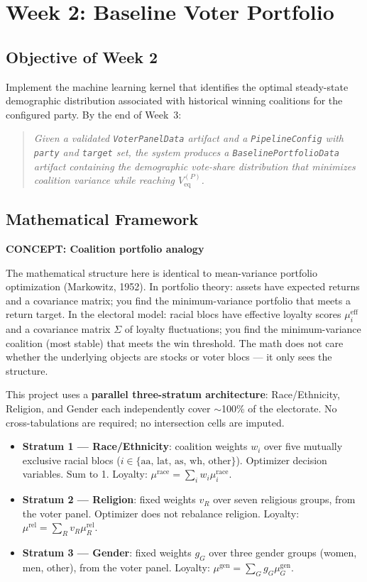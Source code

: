 \documentclass[11pt]{article}
\newcommand{\concept}[2]{%
  \begin{mdframed}[style=conceptbox]
  {\small\bfseries\color{bluefg}CONCEPT: #1}\par\smallskip #2
  \end{mdframed}}
\newcommand{\veq}{V_{\mathrm{eq}}}
\begin{document}
\section{Week 2: Baseline Voter Portfolio}

\subsection*{Objective of Week 2}

Implement the machine learning kernel that identifies the optimal steady-state demographic
distribution associated with historical winning coalitions for the configured party. By the end of Week~3:

\begin{quote}
\textit{Given a validated \texttt{VoterPanelData} artifact and a \texttt{PipelineConfig}
with \texttt{party} and \texttt{target} set, the system produces a
\texttt{BaselinePortfolioData} artifact containing the demographic vote-share
distribution that minimizes coalition variance while reaching $\veq^{(P)}$.}
\end{quote}

\subsection*{Mathematical Framework}

\concept{Coalition portfolio analogy}{
The mathematical structure here is identical to mean-variance portfolio optimization
(Markowitz, 1952). In portfolio theory: assets have expected returns and a covariance
matrix; you find the minimum-variance portfolio that meets a return target. In the
electoral model: racial blocs have effective loyalty scores $\mu_i^{\text{eff}}$ and
a covariance matrix $\Sigma$ of loyalty fluctuations; you find the minimum-variance
coalition (most stable) that meets the win threshold. The math does not care whether
the underlying objects are stocks or voter blocs --- it only sees the structure.
}

This project uses a \textbf{parallel three-stratum architecture}: Race/Ethnicity,
Religion, and Gender each independently cover $\sim$100\% of the electorate.
No cross-tabulations are required; no intersection cells are imputed.

\begin{itemize}[leftmargin=1.6em, itemsep=4pt]
  \item \textbf{Stratum 1 --- Race/Ethnicity}: coalition weights $w_i$ over
        five mutually exclusive racial blocs
        ($i \in \{\text{aa, lat, as, wh, other}\}$). Optimizer decision variables.
        Sum to 1. Loyalty: $\mu^{\text{race}} = \sum_i w_i \mu_i^{\text{race}}$.
  \item \textbf{Stratum 2 --- Religion}: fixed weights $v_R$ over seven religious
        groups, from the voter panel. Optimizer does not rebalance religion.
        Loyalty: $\mu^{\text{rel}} = \sum_R v_R \mu_R^{\text{rel}}$.
  \item \textbf{Stratum 3 --- Gender}: fixed weights $g_G$ over three gender groups
        (women, men, other), from the voter panel.
        Loyalty: $\mu^{\text{gen}} = \sum_G g_G \mu_G^{\text{gen}}$.
\end{itemize}
\end{document}
